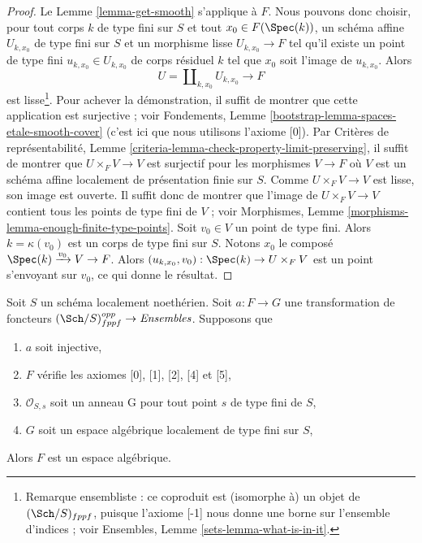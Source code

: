 \begin{proof}
Le Lemme \ref{lemma-get-smooth} s'applique à $F$. Nous pouvons donc
choisir, pour tout corps $k$ de type fini sur $S$ et tout $x_0 \in F(\Spec(k))$,
un schéma affine $U_{k, x_0}$ de type fini sur $S$ et un morphisme lisse
$U_{k, x_0} \to F$ tel qu'il existe un point de type fini
$u_{k, x_0} \in U_{k, x_0}$ de corps résiduel $k$ tel que $x_0$
soit l'image de $u_{k, x_0}$. Alors
$$
U = \coprod\nolimits_{k, x_0} U_{k, x_0} \longrightarrow F
$$
est lisse\footnote{Remarque ensembliste : ce coproduit est (isomorphe à)
un objet de $(\Sch/S)_{fppf}$, puisque l'axiome [-1] nous donne une borne
sur l'ensemble d'indices ; voir Ensembles, Lemme \ref{sets-lemma-what-is-in-it}.}.
Pour achever la démonstration, il suffit de montrer que cette application est surjective ;
voir Fondements, Lemme \ref{bootstrap-lemma-spaces-etale-smooth-cover}
(c'est ici que nous utilisons l'axiome [0]). Par Critères de représentabilité, Lemme
\ref{criteria-lemma-check-property-limit-preserving},
il suffit de montrer que $U \times_F V \to V$ est surjectif pour les morphismes
$V \to F$ où $V$ est un schéma affine localement de présentation finie
sur $S$. Comme $U \times_F V \to V$ est lisse, son image est ouverte. Il
suffit donc de montrer que l'image de $U \times_F V \to V$ contient tous les
points de type fini de $V$ ; voir
Morphismes, Lemme \ref{morphisms-lemma-enough-finite-type-points}.
Soit $v_0 \in V$ un point de type fini. Alors $k = \kappa(v_0)$ est
un corps de type fini sur $S$. Notons $x_0$ le composé
$\Spec(k) \xrightarrow{v_0} V \to F$. Alors
$(u_{k, x_0}, v_0) : \Spec(k) \to U \times_F V$ est un point s'envoyant sur
$v_0$, ce qui donne le résultat.
\end{proof}

\begin{lemma}
\label{lemma-monomorphism}
Soit $S$ un schéma localement noethérien. Soit $a : F \to G$ une transformation
de foncteurs $(\Sch/S)_{fppf}^{opp} \to \textit{Ensembles}$.
Supposons que
\begin{enumerate}
\item $a$ soit injective,
\item $F$ vérifie les axiomes [0], [1], [2], [4] et [5],
\item $\mathcal{O}_{S, s}$ soit un anneau G pour tout point $s$ de type fini de $S$,
\item $G$ soit un espace algébrique localement de type fini sur $S$,
\end{enumerate}
Alors $F$ est un espace algébrique.
\end{lemma}

